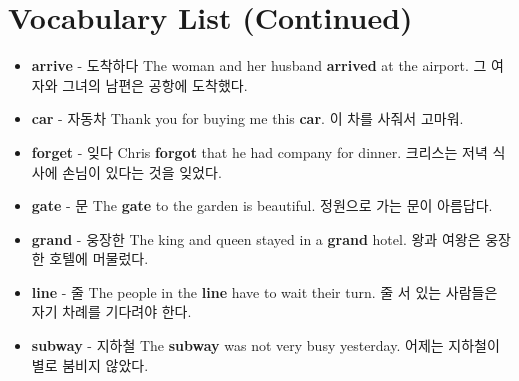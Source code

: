 \documentclass{article}
\begin{document}
\section*{Vocabulary List (Continued)}
\begin{addmargin}[1em]{1em}
    \begin{itemize}
        \item \fontsize{12pt}{14pt}\selectfont \textbf{arrive} - 도착하다 \newline
        The woman and her husband \textbf{arrived} at the airport. \newline
        그 여자와 그녀의 남편은 공항에 도착했다.
        
        \item \fontsize{12pt}{14pt}\selectfont \textbf{car} - 자동차 \newline
        Thank you for buying me this \textbf{car}. \newline
        이 차를 사줘서 고마워.
        
        \item \fontsize{12pt}{14pt}\selectfont \textbf{forget} - 잊다 \newline
        Chris \textbf{forgot} that he had company for dinner. \newline
        크리스는 저녁 식사에 손님이 있다는 것을 잊었다.
        
        \item \fontsize{12pt}{14pt}\selectfont \textbf{gate} - 문 \newline
        The \textbf{gate} to the garden is beautiful. \newline
        정원으로 가는 문이 아름답다.
        
        \item \fontsize{12pt}{14pt}\selectfont \textbf{grand} - 웅장한 \newline
        The king and queen stayed in a \textbf{grand} hotel. \newline
        왕과 여왕은 웅장한 호텔에 머물렀다.
        
        \item \fontsize{12pt}{14pt}\selectfont \textbf{line} - 줄 \newline
        The people in the \textbf{line} have to wait their turn. \newline
        줄 서 있는 사람들은 자기 차례를 기다려야 한다.
        
        \item \fontsize{12pt}{14pt}\selectfont \textbf{subway} - 지하철 \newline
        The \textbf{subway} was not very busy yesterday. \newline
        어제는 지하철이 별로 붐비지 않았다.
        

\end{itemize}
\end{addmargin}
\end{document}
